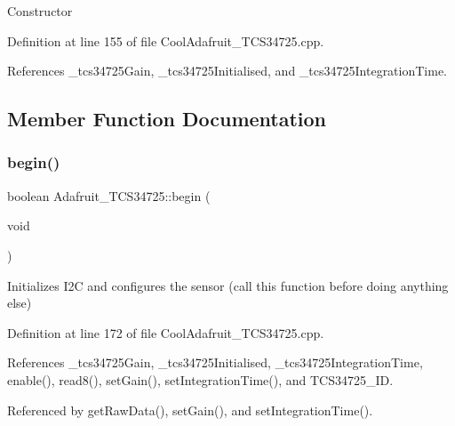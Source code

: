 Constructor 

Definition at line 155 of file Cool\+Adafruit\+\_\+\+T\+C\+S34725.\+cpp.



References \+\_\+tcs34725\+Gain, \+\_\+tcs34725\+Initialised, and \+\_\+tcs34725\+Integration\+Time.



\subsection{Member Function Documentation}
\mbox{\label{class_adafruit___t_c_s34725_a568d79b6382ac27010a8afc26cbdae79}} 
\subsubsection{\texorpdfstring{begin()}{begin()}}
{\footnotesize\ttfamily boolean Adafruit\+\_\+\+T\+C\+S34725\+::begin (\begin{DoxyParamCaption}\item[{void}]{ }\end{DoxyParamCaption})}

Initializes I2C and configures the sensor (call this function before doing anything else) 

Definition at line 172 of file Cool\+Adafruit\+\_\+\+T\+C\+S34725.\+cpp.



References \+\_\+tcs34725\+Gain, \+\_\+tcs34725\+Initialised, \+\_\+tcs34725\+Integration\+Time, enable(), read8(), set\+Gain(), set\+Integration\+Time(), and T\+C\+S34725\+\_\+\+ID.



Referenced by get\+Raw\+Data(), set\+Gain(), and set\+Integration\+Time().

